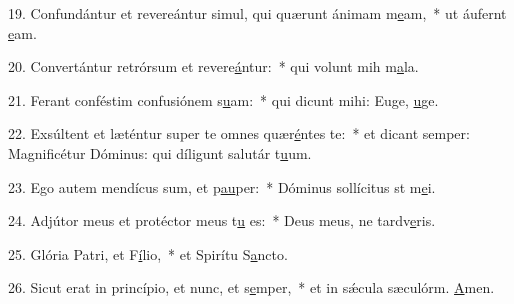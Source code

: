19. Confundántur et revereántur simul, qui quærunt ánimam m\uline{e}am,~* ut áufernt \uline{e}am.\par 
20. Convertántur retrórsum et revere\uline{á}ntur:~* qui volunt mih m\uline{a}la.\par 
21. Ferant conféstim confusiónem s\uline{u}am:~* qui dicunt mihi: Euge, \uline{u}ge.\par 
22. Exsúltent et læténtur super te omnes quær\uline{é}ntes te:~* et dicant semper: Magnificétur Dóminus: qui díligunt salutár t\uline{u}um.\par 
23. Ego autem mendícus sum, et p\uline{au}per:~* Dóminus sollícitus st m\uline{e}i.\par 
24. Adjútor meus et protéctor meus t\uline{u} es:~* Deus meus, ne tardv\uline{e}ris.\par 
25. Glória Patri, et F\uline{í}lio,~* et Spirítu S\uline{a}ncto.\par 
26. Sicut erat in princípio, et nunc, et s\uline{e}mper,~* et in sǽcula sæculórm. \uline{A}men.\par 
